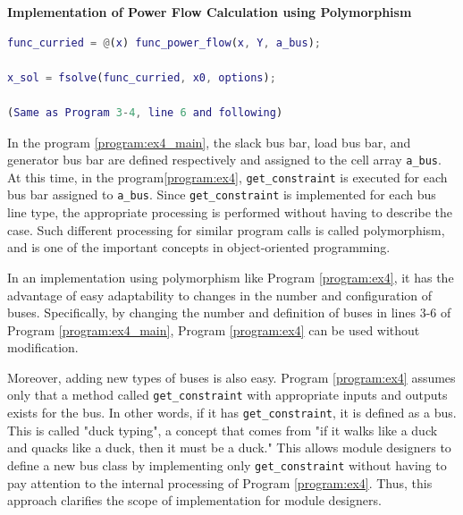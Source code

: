 \documentclass[graybox, envcountchap]{svmult}
\begin{document}
\begin{example}{\textbf{Implementation of Power Flow Calculation using Polymorphism}}
\begin{lstlisting}[language=Matlab, caption=main\_ex4.m, label={program:ex4_main}]
func_curried = @(x) func_power_flow(x, Y, a_bus);

x_sol = fsolve(func_curried, x0, options);

(Same as Program 3-4, line 6 and following)
\end{lstlisting}

In the program \nobreak\ref{program:ex4_main}, the slack bus bar, load bus bar,
and generator bus bar are defined respectively and assigned to the cell array
\verb|a_bus|. At this time, in the program\nobreak\ref{program:ex4},
\verb|get_constraint| is executed for each bus bar assigned to \verb|a_bus|.
Since \verb|get_constraint| is implemented for each bus line type, the
appropriate processing is performed without having to describe the case. Such
different processing for similar program calls is called {polymorphism}, and is
one of the important concepts in object-oriented programming.


In an implementation using polymorphism like Program \ref{program:ex4}, it has
the advantage of easy adaptability to changes in the number and configuration of
buses. Specifically, by changing the number and definition of buses in lines 3-6
of Program \ref{program:ex4_main}, Program \ref{program:ex4} can be used without
modification.

Moreover, adding new types of buses is also easy. Program \ref{program:ex4}
assumes only that a method called \verb|get_constraint| with appropriate inputs
and outputs exists for the bus. In other words, if it has \verb|get_constraint|,
it is defined as a bus. This is called "duck typing", a concept that comes from
"if it walks like a duck and quacks like a duck, then it must be a duck." This
allows module designers to define a new bus class by implementing only
\verb|get_constraint| without having to pay attention to the internal processing
of Program \ref{program:ex4}. Thus, this approach clarifies the scope of
implementation for module designers.
\end{example}
\end{document}
